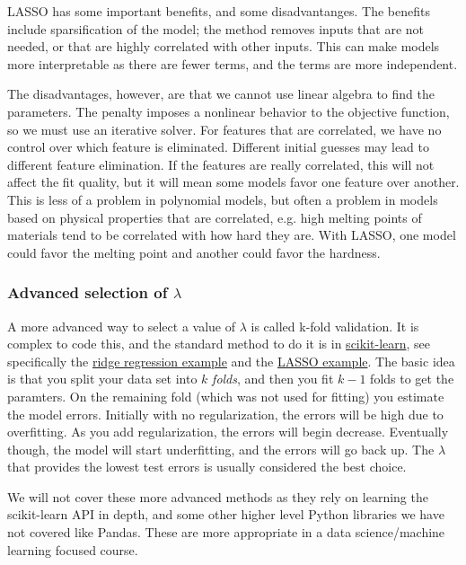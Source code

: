 \documentclass[11pt]{article}
\begin{document}
LASSO has some important benefits, and some disadvantanges. The benefits include sparsification of the model; the method removes inputs that are not needed, or that are highly correlated with other inputs. This can make models more interpretable as there are fewer terms, and the terms are more independent.

The disadvantages, however, are that we cannot use linear algebra to find the parameters. The penalty imposes a nonlinear behavior to the objective function, so we must use an iterative solver. For features that are correlated, we have no control over which feature is eliminated. Different initial guesses may lead to different feature elimination. If the features are really correlated, this will not affect the fit quality, but it will mean some models favor one feature over another. This is less of a problem in polynomial models, but often a problem in models based on physical properties that are correlated, e.g. high melting points of materials tend to be correlated with how hard they are. With LASSO, one model could favor the melting point and another could favor the hardness.

\subsubsection{Advanced selection of \(\lambda\)}
\label{sec:org864dc5d}

A more advanced way to select a value of \(\lambda\) is called k-fold validation. It is complex to code this, and the standard method to do it is in \href{https://scikit-learn.org/stable/index.html}{scikit-learn}, see specifically the \href{https://scikit-learn.org/stable/modules/linear\_model.html\#ridge-regression}{ridge regression example} and the  \href{https://scikit-learn.org/stable/modules/linear\_model.html\#lasso}{LASSO example}. The basic idea is that you split your data set into \(k\) \emph{folds}, and then you fit \(k-1\) folds to get the paramters. On the remaining fold (which was not used for fitting) you estimate the model errors. Initially with no regularization, the errors will be high due to overfitting. As you add regularization, the errors will begin decrease. Eventually though, the model will start underfitting, and the errors will go back up. The \(\lambda\) that provides the lowest test errors is usually considered the best choice.

We will not cover these more advanced methods as they rely on learning the scikit-learn API in depth, and some other higher level Python libraries we have not covered like Pandas. These are more appropriate in a data science/machine learning focused course.
\end{document}
